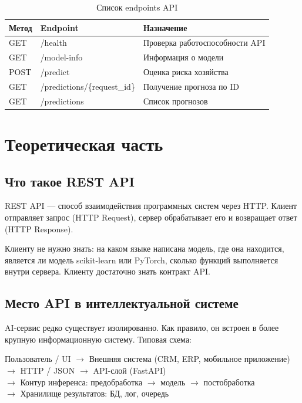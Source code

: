 \documentclass[12pt,a4paper]{article}
\begin{document}
\begin{table}[H]
\centering
\caption{Список endpoints API}
\label{tab:endpoints}
\begin{tabular}{|l|l|l|}
\hline
\textbf{Метод} & \textbf{Endpoint} & \textbf{Назначение} \\
\hline
GET  & /health                    & Проверка работоспособности API \\
GET  & /model-info                & Информация о модели \\
POST & /predict                   & Оценка риска хозяйства \\
GET  & /predictions/\{request\_id\} & Получение прогноза по ID \\
GET  & /predictions               & Список прогнозов \\
\hline
\end{tabular}
\end{table}

\section{Теоретическая часть}

\subsection{Что такое REST API}

REST API — способ взаимодействия программных систем через HTTP. Клиент отправляет запрос (HTTP Request), сервер обрабатывает его и возвращает ответ (HTTP Response).

Клиенту не нужно знать: на каком языке написана модель, где она находится, является ли модель scikit-learn или PyTorch, сколько функций выполняется внутри сервера. Клиенту достаточно знать контракт API.

\subsection{Место API в интеллектуальной системе}

AI-сервис редко существует изолированно. Как правило, он встроен в более крупную информационную систему. Типовая схема:

\begin{center}
Пользователь / UI $\rightarrow$ Внешняя система (CRM, ERP, мобильное приложение) \\
$\rightarrow$ HTTP / JSON $\rightarrow$ API-слой (FastAPI) \\
$\rightarrow$ Контур инференса: предобработка $\rightarrow$ модель $\rightarrow$ постобработка \\
$\rightarrow$ Хранилище результатов: БД, лог, очередь
\end{center}
\end{document}
